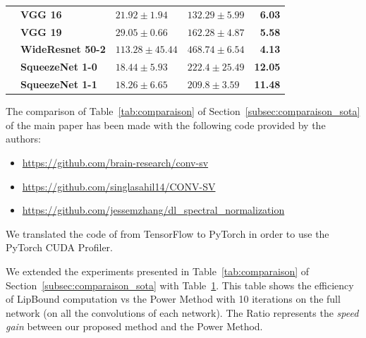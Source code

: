 \begin{table}[htb]
{\begin{tabular}{llllr}
      & \textbf{VGG 16} & \phantom{..}$21.92\pm1.94$ & \phantom{..}$132.29\pm5.99$ & \textbf{6.03 }\\
      & \textbf{VGG 19} & \phantom{..}$29.05\pm0.66$ & \phantom{..}$162.28\pm4.87$ & \textbf{5.58 }\\
    \midrule
    \cite{zagoruyko2016wide} & \textbf{WideResnet 50-2} & $113.28\pm45.44$ & \phantom{..}$468.74\pm6.54$ & \textbf{4.13 }\\
    \midrule
    \multirow{2}[2]{*}{\cite{iandola2016squeezenet}} & \textbf{SqueezeNet 1-0} & \phantom{..}$18.44\pm5.93$ & \phantom{....}$222.4\pm25.49$ & \textbf{12.05} \\
      & \textbf{SqueezeNet 1-1} & \phantom{..}$18.26\pm6.65$ & \phantom{....}$209.8\pm3.59$ & \textbf{11.48} \\
    \bottomrule
    \end{tabular}%
    }
  \label{tab:efficiency_lipbound_full_model}%
\end{table}%

The comparison of Table~\ref{tab:comparaison} of Section~\ref{subsec:comparaison_sota} of the main paper has been made with the following code provided by the authors: 
\begin{itemize}
    \item {} \url{https://github.com/brain-research/conv-sv}
    \item {} \url{https://github.com/singlasahil14/CONV-SV}
    \item {} \url{https://github.com/jessemzhang/dl_spectral_normalization}
\end{itemize}
We translated the code of \cite{sedghi2018the} from TensorFlow to PyTorch in order to use the PyTorch CUDA Profiler.

We extended the experiments presented in Table~\ref{tab:comparaison} of Section~\ref{subsec:comparaison_sota} with Table~\ref{tab:efficiency_lipbound_full_model}. This table shows the efficiency of LipBound computation vs the Power Method with 10 iterations on the full network (\ie on all the convolutions of each network). The Ratio represents the {\em speed gain} between our proposed method and the Power Method. 


